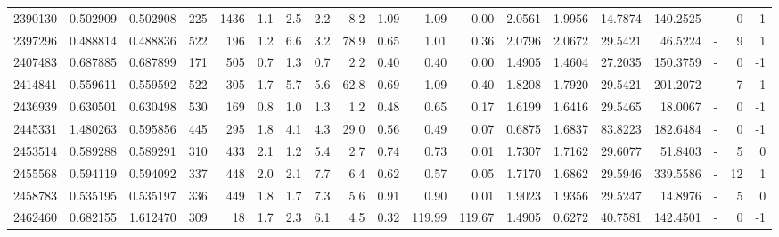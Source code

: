\begin{tabular}{rrrrrrrrrrrrrrrrlrr}
   2390130 & 0.502909 &   0.502908 &  225 & 1436 &      1.1 &      2.5 &     2.2 &      8.2 &       1.09 &        1.09 &        0.00 &  2.0561 &  1.9956 &   14.7874 &  140.2525 &             - &        0 &         -1 \\
   2397296 & 0.488814 &   0.488836 &  522 &  196 &      1.2 &      6.6 &     3.2 &     78.9 &       0.65 &        1.01 &        0.36 &  2.0796 &  2.0672 &   29.5421 &   46.5224 &             - &        9 &          1 \\
   2407483 & 0.687885 &   0.687899 &  171 &  505 &      0.7 &      1.3 &     0.7 &      2.2 &       0.40 &        0.40 &        0.00 &  1.4905 &  1.4604 &   27.2035 &  150.3759 &             - &        0 &         -1 \\
   2414841 & 0.559611 &   0.559592 &  522 &  305 &      1.7 &      5.7 &     5.6 &     62.8 &       0.69 &        1.09 &        0.40 &  1.8208 &  1.7920 &   29.5421 &  201.2072 &             - &        7 &          1 \\
   2436939 & 0.630501 &   0.630498 &  530 &  169 &      0.8 &      1.0 &     1.3 &      1.2 &       0.48 &        0.65 &        0.17 &  1.6199 &  1.6416 &   29.5465 &   18.0067 &             - &        0 &         -1 \\
   2445331 & 1.480263 &   0.595856 &  445 &  295 &      1.8 &      4.1 &     4.3 &     29.0 &       0.56 &        0.49 &        0.07 &  0.6875 &  1.6837 &   83.8223 &  182.6484 &             - &        0 &         -1 \\
   2453514 & 0.589288 &   0.589291 &  310 &  433 &      2.1 &      1.2 &     5.4 &      2.7 &       0.74 &        0.73 &        0.01 &  1.7307 &  1.7162 &   29.6077 &   51.8403 &             - &        5 &          0 \\
   2455568 & 0.594119 &   0.594092 &  337 &  448 &      2.0 &      2.1 &     7.7 &      6.4 &       0.62 &        0.57 &        0.05 &  1.7170 &  1.6862 &   29.5946 &  339.5586 &             - &       12 &          1 \\
   2458783 & 0.535195 &   0.535197 &  336 &  449 &      1.8 &      1.7 &     7.3 &      5.6 &       0.91 &        0.90 &        0.01 &  1.9023 &  1.9356 &   29.5247 &   14.8976 &             - &        5 &          0 \\
   2462460 & 0.682155 &   1.612470 &  309 &   18 &      1.7 &      2.3 &     6.1 &      4.5 &       0.32 &      119.99 &      119.67 &  1.4905 &  0.6272 &   40.7581 &  142.4501 &             - &        0 &         -1 \\

\end{tabular}
